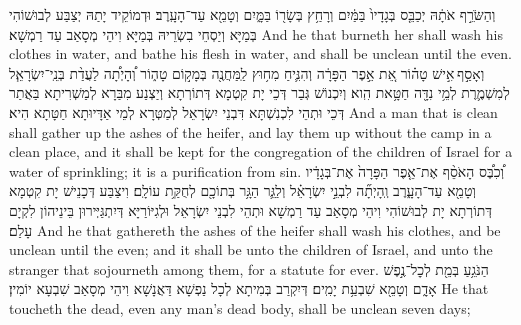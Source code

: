 {וְהַשֹּׂרֵ֣ף אֹתָ֔הּ יְכַבֵּ֤ס בְּגָדָיו֙ בַּמַּ֔יִם וְרָחַ֥ץ בְּשָׂר֖וֹ בַּמָּ֑יִם וְטָמֵ֖א עַד־הָעָֽרֶב׃}
{וּדְמוֹקֵיד יָתַהּ יְצַבַּע לְבוּשׁוֹהִי בְּמַיָּא וְיַסְחֵי בִשְׂרֵיהּ בְּמַיָּא וִיהֵי מְסָאַב עַד רַמְשָׁא׃}
{And he that burneth her shall wash his clothes in water, and bathe his flesh in water, and shall be unclean until the even.}{}
{וְאָסַ֣ף \legarmeh  אִ֣ישׁ טָה֗וֹר אֵ֚ת אֵ֣פֶר הַפָּרָ֔ה וְהִנִּ֛יחַ מִח֥וּץ לַֽמַּחֲנֶ֖ה בְּמָק֣וֹם טָה֑וֹר וְ֠הָיְתָ֠ה לַעֲדַ֨ת בְּנֵֽי־יִשְׂרָאֵ֧ל לְמִשְׁמֶ֛רֶת לְמֵ֥י נִדָּ֖ה חַטָּ֥את הִֽוא׃
}
{וְיִכְנוֹשׁ גְּבַר דְּכֵי יָת קִטְמָא דְּתוֹרְתָא וְיַצְנַע מִבַּרָא לְמַשְׁרִיתָא בַּאֲתַר דְּכֵי וּתְהֵי לִכְנִשְׁתָּא דִּבְנֵי יִשְׂרָאֵל לְמַטְּרָא לְמֵי אַדָּיוּתָא חַטָּתָא הִיא׃}
{And a man that is clean shall gather up the ashes of the heifer, and lay them up without the camp in a clean place, and it shall be kept for the congregation of the children of Israel for a water of sprinkling; it is a purification from sin.}{}
{וְ֠כִבֶּ֠ס הָאֹסֵ֨ף אֶת־אֵ֤פֶר הַפָּרָה֙ אֶת־בְּגָדָ֔יו וְטָמֵ֖א עַד־הָעָ֑רֶב וְֽהָיְתָ֞ה לִבְנֵ֣י יִשְׂרָאֵ֗ל וְלַגֵּ֛ר הַגָּ֥ר בְּתוֹכָ֖ם לְחֻקַּ֥ת עוֹלָֽם׃}
{וִיצַבַּע דְּכָנֵישׁ יָת קִטְמָא דְּתוֹרְתָא יָת לְבוּשׁוֹהִי וִיהֵי מְסָאַב עַד רַמְשָׁא וּתְהֵי לִבְנֵי יִשְׂרָאֵל וּלְגִיּוֹרַיָּא דְּיִתְגַּיְּירוּן בֵּינֵיהוֹן לִקְיָם עָלַם׃}
{And he that gathereth the ashes of the heifer shall wash his clothes, and be unclean until the even; and it shall be unto the children of Israel, and unto the stranger that sojourneth among them, for a statute for ever.}{}
{הַנֹּגֵ֥עַ בְּמֵ֖ת לְכׇל־נֶ֣פֶשׁ אָדָ֑ם וְטָמֵ֖א שִׁבְעַ֥ת יָמִֽים׃}
{דְּיִקְרַב בְּמִיתָא לְכָל נַפְשָׁא דַּאֲנָשָׁא וִיהֵי מְסָאַב שִׁבְעָא יוֹמִין׃}
{He that toucheth the dead, even any man’s dead body, shall be unclean seven days;}{}
